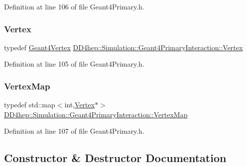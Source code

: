 Definition at line 106 of file Geant4\+Primary.\+h.

\hypertarget{class_d_d4hep_1_1_simulation_1_1_geant4_primary_interaction_a2577cfaf475b28c703eb8e0dce5cccde}{}\label{class_d_d4hep_1_1_simulation_1_1_geant4_primary_interaction_a2577cfaf475b28c703eb8e0dce5cccde} 
\subsubsection{\texorpdfstring{Vertex}{Vertex}}
{\footnotesize\ttfamily typedef \hyperlink{class_d_d4hep_1_1_simulation_1_1_geant4_vertex}{Geant4\+Vertex} \hyperlink{class_d_d4hep_1_1_simulation_1_1_geant4_primary_interaction_a2577cfaf475b28c703eb8e0dce5cccde}{D\+D4hep\+::\+Simulation\+::\+Geant4\+Primary\+Interaction\+::\+Vertex}}



Definition at line 105 of file Geant4\+Primary.\+h.

\hypertarget{class_d_d4hep_1_1_simulation_1_1_geant4_primary_interaction_a0016a8298291af16ea8f24a054cb864c}{}\label{class_d_d4hep_1_1_simulation_1_1_geant4_primary_interaction_a0016a8298291af16ea8f24a054cb864c} 
\subsubsection{\texorpdfstring{Vertex\+Map}{VertexMap}}
{\footnotesize\ttfamily typedef std\+::map$<$int,\hyperlink{class_d_d4hep_1_1_simulation_1_1_geant4_primary_interaction_a2577cfaf475b28c703eb8e0dce5cccde}{Vertex}$\ast$$>$ \hyperlink{class_d_d4hep_1_1_simulation_1_1_geant4_primary_interaction_a0016a8298291af16ea8f24a054cb864c}{D\+D4hep\+::\+Simulation\+::\+Geant4\+Primary\+Interaction\+::\+Vertex\+Map}}



Definition at line 107 of file Geant4\+Primary.\+h.



\subsection{Constructor \& Destructor Documentation}
\hypertarget{class_d_d4hep_1_1_simulation_1_1_geant4_primary_interaction_a5ffd12789ddae75709c4677e4a6a7cac}{}\label{class_d_d4hep_1_1_simulation_1_1_geant4_primary_interaction_a5ffd12789ddae75709c4677e4a6a7cac} 
